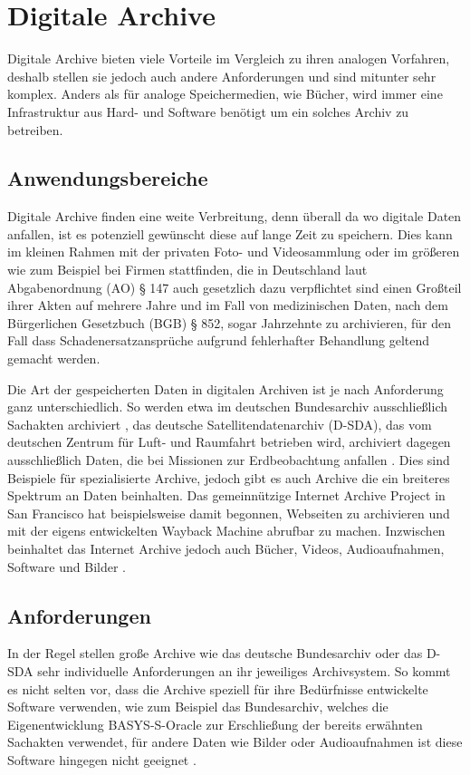 \documentclass[conference,compsoc,final,a4paper]{IEEEtran}
\begin{document}
\section{Digitale Archive}
Digitale Archive bieten viele Vorteile im Vergleich zu ihren analogen Vorfahren, deshalb stellen sie jedoch auch andere Anforderungen und sind mitunter sehr komplex. Anders als für analoge Speichermedien, wie Bücher, wird immer eine Infrastruktur aus Hard- und Software benötigt um ein solches Archiv zu betreiben.

\subsection{Anwendungsbereiche}
Digitale Archive finden eine weite Verbreitung, denn überall da wo digitale Daten anfallen, ist es potenziell gewünscht diese auf lange Zeit zu speichern. Dies kann im kleinen Rahmen mit der privaten Foto- und Videosammlung oder im größeren wie zum Beispiel bei Firmen stattfinden, die in Deutschland laut Abgabenordnung (AO) § 147 auch gesetzlich dazu verpflichtet sind einen Großteil ihrer Akten auf mehrere Jahre und im Fall von medizinischen Daten, nach dem Bürgerlichen Gesetzbuch (BGB) § 852, sogar Jahrzehnte zu archivieren, für den Fall dass Schadenersatzansprüche aufgrund fehlerhafter Behandlung geltend gemacht werden.

Die Art der gespeicherten Daten in digitalen Archiven ist je nach Anforderung ganz unterschiedlich. So werden etwa im deutschen Bundesarchiv ausschließlich Sachakten archiviert \autocite{Berger2005}, das deutsche Satellitendatenarchiv (\acs{D-SDA}), das vom deutschen Zentrum für Luft- und Raumfahrt betrieben wird, archiviert dagegen ausschließlich Daten, die bei Missionen zur Erdbeobachtung anfallen \autocite{Memishi2019}. Dies sind Beispiele für spezialisierte Archive, jedoch gibt es auch Archive die ein breiteres Spektrum an Daten beinhalten. Das gemeinnützige Internet Archive Project in San Francisco hat beispielsweise damit begonnen, Webseiten zu archivieren und mit der eigens entwickelten Wayback Machine abrufbar zu machen. Inzwischen beinhaltet das Internet Archive jedoch auch Bücher, Videos, Audioaufnahmen, Software und Bilder \autocite{AboutIA}.

\subsection{Anforderungen}
In der Regel stellen große Archive wie das deutsche Bundesarchiv oder das \acs{D-SDA} sehr individuelle Anforderungen an ihr jeweiliges Archivsystem. So kommt es nicht selten vor, dass die Archive speziell für ihre Bedürfnisse entwickelte Software verwenden, wie zum Beispiel das Bundesarchiv, welches die Eigenentwicklung BASYS-S-Oracle zur Erschließung der bereits erwähnten Sachakten verwendet, für andere Daten wie Bilder oder Audioaufnahmen ist diese Software hingegen nicht geeignet \autocite{Berger2005}.
\end{document}
